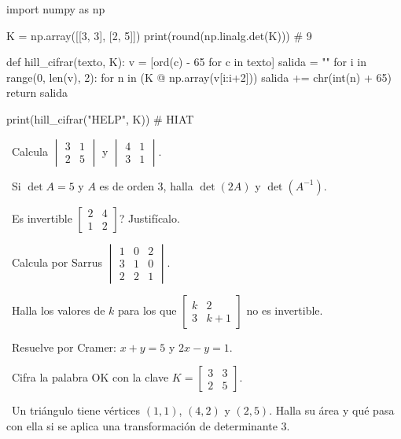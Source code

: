 \begin{tmcodigo}
import numpy as np

K = np.array([[3, 3], [2, 5]])
print(round(np.linalg.det(K)))        # 9

def hill_cifrar(texto, K):
    v = [ord(c) - 65 for c in texto]
    salida = ""
    for i in range(0, len(v), 2):
        for n in (K @ np.array(v[i:i+2])) %
            salida += chr(int(n) + 65)
    return salida

print(hill_cifrar("HELP", K))         # HIAT
\end{tmcodigo}

\begin{tmejercicios}
\label{ej:3-4}
\begin{tmlista}
\item \tmbasico\ Calcula $\begin{vmatrix}3&1\\2&5\end{vmatrix}$ y $\begin{vmatrix}4&1\\3&1\end{vmatrix}$.
\item \tmbasico\ Si $\det A=5$ y $A$ es de orden 3, halla $\det(2A)$ y $\det(A^{-1})$.
\item \tmbasico\ \textquestiondown Es invertible $\begin{bmatrix}2&4\\1&2\end{bmatrix}$? Justif\'icalo.
\item \tmmedio\ Calcula por Sarrus $\begin{vmatrix}1&0&2\\3&1&0\\2&2&1\end{vmatrix}$.
\item \tmmedio\ Halla los valores de $k$ para los que $\begin{bmatrix}k&2\\3&k+1\end{bmatrix}$ no es invertible.
\item \tmmedio\ Resuelve por Cramer: $x+y=5$ y $2x-y=1$.
\item \tmdificil\ Cifra la palabra OK con la clave $K=\begin{bmatrix}3&3\\2&5\end{bmatrix}$.
\item \tmdificil\ Un tri\'angulo tiene v\'ertices $(1, 1)$, $(4, 2)$ y $(2, 5)$. Halla su \'area y qu\'e pasa con ella si se aplica una transformaci\'on de determinante 3.
\end{tmlista}
\end{tmejercicios}

